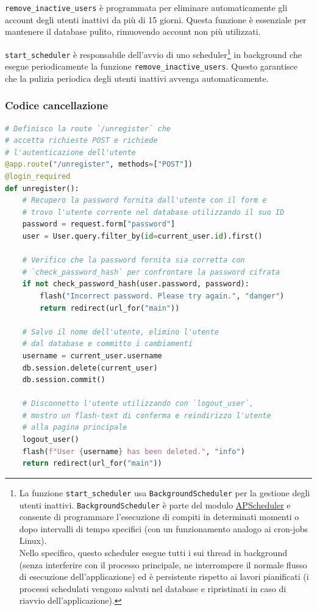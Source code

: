 \documentclass[12pt]{report}
\begin{document}
\texttt{remove\_inactive\_users} è programmata per eliminare automaticamente gli account degli utenti inattivi da più di 15 giorni. Questa funzione è essenziale per mantenere il database pulito, rimuovendo account non più utilizzati.

\texttt{start\_scheduler} è responsabile dell'avvio di uno scheduler\footnote{La funzione \texttt{start\_scheduler} usa \texttt{BackgroundScheduler} per la gestione degli utenti inattivi. \texttt{BackgroundScheduler} è parte del modulo \href{https://apscheduler.readthedocs.io/en/stable/}{\textsf{APScheduler}} e consente di programmare l'esecuzione di compiti in determinati momenti o dopo intervalli di tempo specifici (con un funzionamento analogo ai cron-jobs Linux).\\
Nello specifico, questo scheduler esegue tutti i sui thread in background (senza interferire con il processo principale, ne interrompere il normale flusso di esecuzione dell'applicazione) ed è persistente rispetto ai lavori pianificati (i processi schedulati vengono salvati nel database e ripristinati in caso di riavvio dell'applicazione).} in background che esegue periodicamente la funzione \texttt{remove\_inactive\_users}. Questo garantisce che la pulizia periodica degli utenti inattivi avvenga automaticamente.


\newpage
\subsubsection{Codice cancellazione}
\begin{lstlisting}[language=Python]
# Definisco la route `/unregister` che
# accetta richieste POST e richiede
# l'autenticazione dell'utente
@app.route("/unregister", methods=["POST"])
@login_required
def unregister():
    # Recupero la password fornita dall'utente con il form e
    # trovo l'utente corrente nel database utilizzando il suo ID
    password = request.form["password"]
    user = User.query.filter_by(id=current_user.id).first()

    # Verifico che la password fornita sia corretta con
    # `check_password_hash` per confrontare la password cifrata
    if not check_password_hash(user.password, password):
        flash("Incorrect password. Please try again.", "danger")
        return redirect(url_for("main"))

    # Salvo il nome dell'utente, elimino l'utente
    # dal database e committo i cambiamenti
    username = current_user.username
    db.session.delete(current_user)
    db.session.commit()

    # Disconnetto l'utente utilizzando con `logout_user`,
    # mostro un flash-text di conferma e reindirizzo l'utente
    # alla pagina principale
    logout_user()
    flash(f"User {username} has been deleted.", "info")
    return redirect(url_for("main"))
\end{lstlisting}
\end{document}
